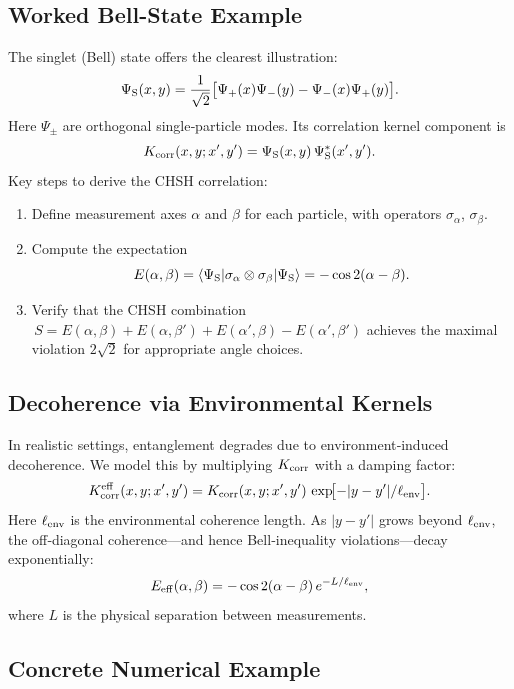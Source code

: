 \subsection{Worked Bell-State Example}

The singlet (Bell) state offers the clearest illustration:
\begin{equation}\label{eq:singlet_repeat}
\Psi_{\rm S}(x,y) = \frac{1}{\sqrt2}\bigl[\Psi_+(x)\Psi_-(y) - \Psi_-(x)\Psi_+(y)\bigr].
\end{equation}
Here \(\Psi_{\pm}\) are orthogonal single‐particle modes.  Its correlation kernel component is
\[
K_{\rm corr}(x,y;x',y')
= \Psi_{\rm S}(x,y)\,\Psi_{\rm S}^*(x',y').
\]
Key steps to derive the CHSH correlation:
\begin{enumerate}
  \item Define measurement axes \(\alpha\) and \(\beta\) for each particle, with operators \(\sigma_\alpha\), \(\sigma_\beta\).
  \item Compute the expectation
  \[
    E(\alpha,\beta)
    = \langle \Psi_{\rm S}|\sigma_\alpha\otimes\sigma_\beta|\Psi_{\rm S}\rangle
    = -\cos2(\alpha - \beta).
  \]
  \item Verify that the CHSH combination
  \(\,S=E(\alpha,\beta)+E(\alpha,\beta')+E(\alpha',\beta)-E(\alpha',\beta')\)
  achieves the maximal violation \(2\sqrt2\) for appropriate angle choices.
\end{enumerate}

\subsection{Decoherence via Environmental Kernels}

In realistic settings, entanglement degrades due to environment‐induced decoherence.  We model this by multiplying \(K_{\rm corr}\) with a damping factor:
\begin{equation}\label{eq:decoherence_factor}
K_{\rm corr}^{\rm eff}(x,y;x',y')
=K_{\rm corr}(x,y;x',y')\,\exp\!\bigl[-|y - y'|/\ell_{\rm env}\bigr].
\end{equation}
Here \(\ell_{\rm env}\) is the environmental coherence length.  As \(|y - y'|\) grows beyond \(\ell_{\rm env}\), the off‐diagonal coherence—and hence Bell‐inequality violations—decay exponentially:
\[
E_{\rm eff}(\alpha,\beta) = -\cos2(\alpha-\beta)\,e^{-L/\ell_{\rm env}},
\]
where \(L\) is the physical separation between measurements.

\subsection{Concrete Numerical Example}

